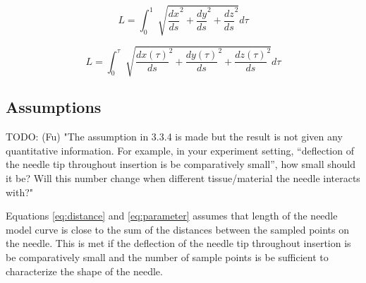 \begin{equation}
\label{eq:length_constraint}
L = \int_0^1 \sqrt[]{\frac{dx}{ds}^2 + \frac{dy}{ds}^2 + \frac{dz}{ds}^2} d\tau
\end{equation}

\begin{equation}
\label{eq:length_calculation}
L = \int_0^\tau \sqrt[]{\frac{dx(\tau)}{ds}^2 + \frac{dy(\tau)}{ds}^2 + \frac{dz(\tau)}{ds}^2} d\tau
\end{equation}



\subsection{Assumptions}

TODO: (Fu) "The assumption in 3.3.4 is made but the result is not given any quantitative information. For example, in your experiment setting, “deflection of the needle tip throughout insertion is be comparatively small”, how small should it be? Will this number change when different tissue/material the needle interacts with?"

Equations \ref{eq:distance} and \ref{eq:parameter} assumes that length of the needle model curve is close to the sum of the distances between the sampled points on the needle. This is met if the deflection of the needle tip throughout insertion is be comparatively small and the number of sample points is be sufficient to characterize the shape of the needle.


